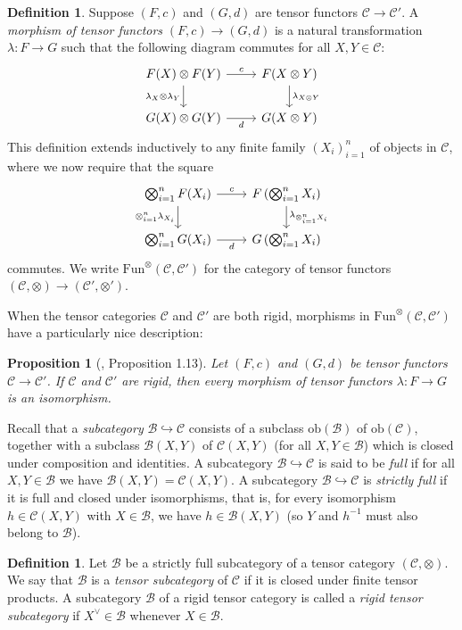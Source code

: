 \documentclass[10pt]{amsart}
\numberwithin{equation}{section}
\def\~#1{\mathscr{#1}}
\newcommand{\mono}{\hookrightarrow}
\newcommand{\ob}{\mathrm{ob}}
\newcommand{\Fun}{\mathrm{Fun}}
\theoremstyle{plain}
\newtheorem{prop}[thm]{Proposition}
\theoremstyle{definition}
\newtheorem{defn}[thm]{Definition}
\theoremstyle{remark}
\begin{document}
\begin{defn}
    Suppose $(F, c)$ and $(G, d)$ are tensor functors $\~C \to \~C'$. A \emph{morphism of tensor functors} $(F, c) \to (G, d)$ is a natural transformation $\lambda: F \to G$ such that the following diagram commutes for all $X, Y \in \~C$:
\[\begin{tikzcd}
    {F(X)\otimes F(Y)} & {F(X \otimes Y)} \\
    {G(X) \otimes G(Y)} & {G(X \otimes Y)}
    \arrow["c", from=1-1, to=1-2]
    \arrow["{\lambda_X\otimes\lambda_Y}"', from=1-1, to=2-1]
    \arrow["{\lambda_{X \otimes Y}}", from=1-2, to=2-2]
    \arrow["d"', from=2-1, to=2-2]
\end{tikzcd}\]
This definition extends inductively to any finite family $(X_i)_{i=1}^n$ of objects in $\~C$, where we now require that the square
    \[\begin{tikzcd}
    {\bigotimes_{i=1}^n F(X_i)} & {F\left(\bigotimes_{i=1}^n X_i \right)} \\
    {\bigotimes_{i=1}^n G(X_i)} & {G\left(\bigotimes_{i=1}^n X_i \right)}
    \arrow["c", from=1-1, to=1-2]
    \arrow["{\otimes_{i=1}^n \lambda_{X_i}}"', from=1-1, to=2-1]
    \arrow["{\lambda_{\otimes_{i=1}^n X_i}}", from=1-2, to=2-2]
    \arrow["d"', from=2-1, to=2-2]
\end{tikzcd}\]
commutes. We write $\Fun^\otimes(\~C, \~C')$ for the category of tensor functors $(\~C, \otimes) \to (\~C', \otimes')$.
\end{defn}
When the tensor categories $\~C$ and $\~C'$ are both rigid, morphisms in $\Fun^\otimes(\~C, \~C')$ have a particularly nice description:
\begin{prop}[\cite{deligne1982tannakian}, Proposition 1.13]
    Let $(F, c)$ and $(G, d)$ be tensor functors $\~C \to \~C'$. If $\~C$ and $\~C'$ are rigid, then every morphism of tensor functors $\lambda: F \to G$ is an isomorphism.
\end{prop}

Recall that a \emph{subcategory} $\~B \mono \~C$ consists of a subclass $\ob(\~B)$ of $\ob(\~C)$, together with a subclass $\~B(X, Y)$ of $\~C(X,Y)$ (for all $X,Y \in \~B$) which is closed under composition and identities. A subcategory $\~B \mono \~C$ is said to be \emph{full} if for all $X, Y \in \~B $ we have $\~B(X,Y) = \~C(X, Y)$. A subcategory $\~B \mono \~C$ is \emph{strictly full} if it is full and closed under isomorphisms, that is, for every isomorphism $h \in \~C(X,Y)$ with $X \in \~B$, we have $h \in \~B(X,Y)$ (so $Y$ and $h^{-1}$ must also belong to $\~B$).
\begin{defn}
Let $\~B$ be a strictly full subcategory of a tensor category $(\~C, \otimes)$. We say that $\~B$ is a \emph{tensor subcategory} of $\~C$ if it is closed under finite tensor products. A subcategory $\~B$ of a rigid tensor category is called a \emph{rigid tensor subcategory} if $X^\vee \in \~B$ whenever $X \in \~B$.
\end{defn}
\end{document}
